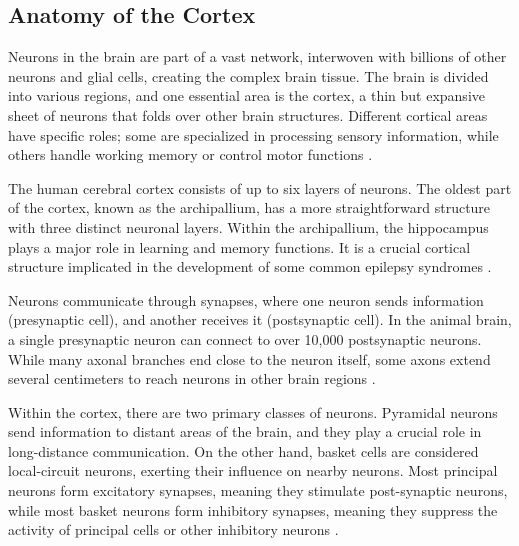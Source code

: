 \documentclass[a4paper, UKenglish, 11pt]{uiomaster}
\begin{document}
\subsection{Anatomy of the Cortex}
Neurons in the brain are part of a vast network, interwoven with billions of other neurons and glial cells, creating the complex brain tissue. The brain is divided into various regions, and one essential area is the cortex, a thin but expansive sheet of neurons that folds over other brain structures. Different cortical areas have specific roles; some are specialized in processing sensory information, while others handle working memory or control motor functions \cite{gerstner2014neuronal}.

The human cerebral cortex consists of up to six layers of neurons. The oldest part of the cortex, known as the archipallium, has a more straightforward structure with three distinct neuronal layers. Within the archipallium, the hippocampus plays a major role in learning and memory functions. It is a crucial cortical structure implicated in the development of some common epilepsy syndromes \cite{bromfield2006introduction}.

Neurons communicate through synapses, where one neuron sends information (presynaptic cell), and another receives it (postsynaptic cell). In the animal brain, a single presynaptic neuron can connect to over 10,000 postsynaptic neurons. While many axonal branches end close to the neuron itself, some axons extend several centimeters to reach neurons in other brain regions \cite{gerstner2014neuronal}.

Within the cortex, there are two primary classes of neurons. Pyramidal neurons send information to distant areas of the brain, and they play a crucial role in long-distance communication. On the other hand, basket cells are considered local-circuit neurons, exerting their influence on nearby neurons. Most principal neurons form excitatory synapses, meaning they stimulate post-synaptic neurons, while most basket neurons form inhibitory synapses, meaning they suppress the activity of principal cells or other inhibitory neurons \cite{bromfield2006introduction}.


%
%
%
\end{document}
